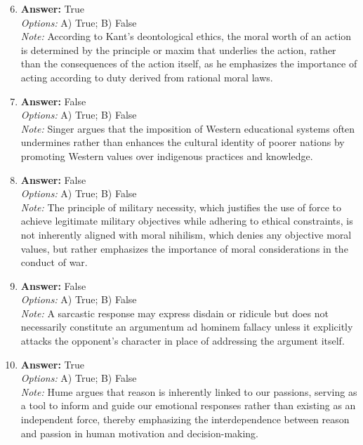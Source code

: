 \documentclass[12pt]{article}
\begin{document}
\begin{enumerate}[label=\arabic*.]
\setcounter{enumi}{5}
\item \textbf{Answer:} True
\\ \textit{Options:} A) True; B) False
\\ \textit{Note:} According to Kant's deontological ethics, the moral worth of an action is determined by the principle or maxim that underlies the action, rather than the consequences of the action itself, as he emphasizes the importance of acting according to duty derived from rational moral laws.
\item \textbf{Answer:} False
\\ \textit{Options:} A) True; B) False
\\ \textit{Note:} Singer argues that the imposition of Western educational systems often undermines rather than enhances the cultural identity of poorer nations by promoting Western values over indigenous practices and knowledge.
\item \textbf{Answer:} False
\\ \textit{Options:} A) True; B) False
\\ \textit{Note:} The principle of military necessity, which justifies the use of force to achieve legitimate military objectives while adhering to ethical constraints, is not inherently aligned with moral nihilism, which denies any objective moral values, but rather emphasizes the importance of moral considerations in the conduct of war.
\item \textbf{Answer:} False
\\ \textit{Options:} A) True; B) False
\\ \textit{Note:} A sarcastic response may express disdain or ridicule but does not necessarily constitute an argumentum ad hominem fallacy unless it explicitly attacks the opponent's character in place of addressing the argument itself.
\item \textbf{Answer:} True
\\ \textit{Options:} A) True; B) False
\\ \textit{Note:} Hume argues that reason is inherently linked to our passions, serving as a tool to inform and guide our emotional responses rather than existing as an independent force, thereby emphasizing the interdependence between reason and passion in human motivation and decision-making.
\end{enumerate}
\end{document}
